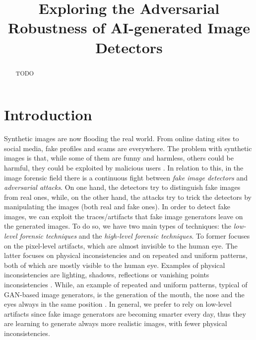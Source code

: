 \documentclass[conference]{IEEEtran} %
\begin{document}

\title{Exploring the Adversarial Robustness of AI-generated Image Detectors}

\author{
}

\maketitle

\begin{abstract}
    TODO
\end{abstract}

\section{Introduction}
    Synthetic images are now flooding the real world. From online dating sites to social media, fake profiles and scams are everywhere. The problem with synthetic images is that, while some of them are funny and harmless, others could be harmful, they could be exploited by malicious users \cite{carlini2020evading}. In relation to this, in the image forensic field there is a continuous fight between \textit{fake image detectors} and \textit{adversarial attacks}. On one hand, the detectors try to distinguish fake images from real ones, while, on the other hand, the attacks try to trick the detectors by manipulating the images (both real and fake ones). In order to detect fake images, we can exploit the traces/artifacts that fake image generators leave on the generated images. To do so, we have two main types of techniques: the \textit{low-level forensic techniques} and the \textit{high-level forensic techniques}. To former focuses on the pixel-level artifacts, which are almost invisible to the human eye. The latter focuses on physical inconsistencies and on repeated and uniform patterns, both of which are mostly visible to the human eye. Examples of physical inconsistencies are lighting, shadows, reflections or vanishing points inconsistencies \cite{farid2022lighting}\cite{farid2022perspective}. While, an example of repeated and uniform patterns, typical of GAN-based image generators, is the generation of the mouth, the nose and the eyes always in the same position \cite{mundra2023exposing}. In general, we prefer to rely on low-level artifacts since fake image generators are becoming smarter every day, thus they are learning to generate always more realistic images, with fewer physical inconsistencies.
\end{document}
